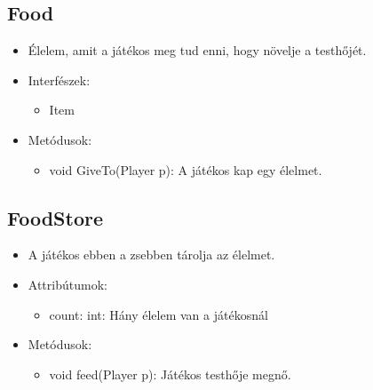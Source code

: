 \subsection{Food}
\begin{itemize}
	\item Élelem, amit a játékos meg tud enni, hogy növelje a testhőjét.	
	\item Interfészek:
	\begin{itemize}
		\item Item
	\end{itemize}
	\item Metódusok:
	\begin{itemize}
		\item void GiveTo(Player p): A játékos kap egy élelmet.
	\end{itemize}
\end{itemize}

\subsection{FoodStore}
\begin{itemize}
	\item A játékos ebben a zsebben tárolja az élelmet.
	\item Attribútumok:
	\begin{itemize}
		\item count: int: Hány élelem van a játékosnál
	\end{itemize}
	\item Metódusok:
	\begin{itemize}
		\item void feed(Player p): Játékos testhője megnő.
	\end{itemize}
\end{itemize}


